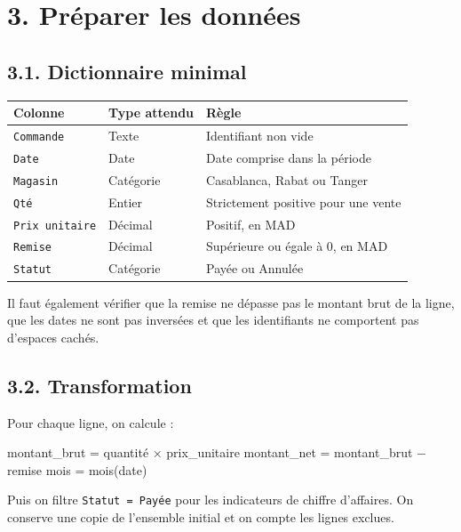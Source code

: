 \documentclass[
  french,
  letterpaper,
  open=any]{scrbook}
\newenvironment{Shaded}{\begin{snugshade}}{\end{snugshade}}
\newcommand{\NormalTok}[1]{\textcolor[rgb]{0.00,0.23,0.31}{#1}}
\newcounter{none} %
\theoremstyle{definition}
\theoremstyle{definition}
\theoremstyle{remark}
\begin{document}
\section{3. Préparer les données}\label{pruxe9parer-les-donnuxe9es}

\subsection{3.1. Dictionnaire minimal}\label{dictionnaire-minimal}

{\def\LTcaptype{none} %
\begin{longtable}[]{@{}lll@{}}
\toprule\noalign{}
Colonne & Type attendu & Règle \\
\midrule\noalign{}
\endhead
\bottomrule\noalign{}
\endlastfoot
\texttt{Commande} & Texte & Identifiant non vide \\
\texttt{Date} & Date & Date comprise dans la période \\
\texttt{Magasin} & Catégorie & Casablanca, Rabat ou Tanger \\
\texttt{Qté} & Entier & Strictement positive pour une vente \\
\texttt{Prix\ unitaire} & Décimal & Positif, en MAD \\
\texttt{Remise} & Décimal & Supérieure ou égale à 0, en MAD \\
\texttt{Statut} & Catégorie & Payée ou Annulée \\
\end{longtable}
}

Il faut également vérifier que la remise ne dépasse pas le montant brut
de la ligne, que les dates ne sont pas inversées et que les identifiants
ne comportent pas d'espaces cachés.

\subsection{3.2. Transformation}\label{transformation}

Pour chaque ligne, on calcule :

\begin{Shaded}
\begin{Highlighting}[]
\NormalTok{montant\_brut = quantité × prix\_unitaire}
\NormalTok{montant\_net = montant\_brut − remise}
\NormalTok{mois = mois(date)}
\end{Highlighting}
\end{Shaded}

Puis on filtre \texttt{Statut\ =\ Payée} pour les indicateurs de chiffre
d'affaires. On conserve une copie de l'ensemble initial et on compte les
lignes exclues.
\end{document}
